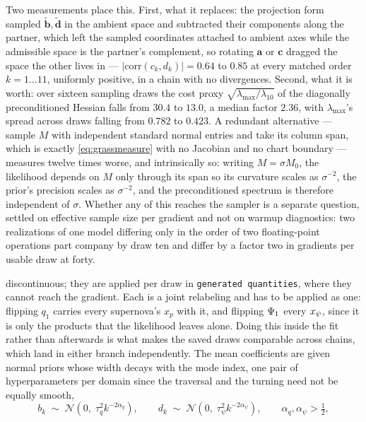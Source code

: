 \documentclass[11pt]{article}
\theoremstyle{plain}
\begin{document}
Two measurements place this. First, what it replaces: the projection form sampled
$\tilde{\mathbf{b}}, \tilde{\mathbf{d}}$ in the ambient space and subtracted their components
along the partner, which left the sampled coordinates attached to ambient axes while the
admissible space is the partner's complement, so rotating $\mathbf{a}$ or $\mathbf{c}$
dragged the space the other lives in --- $|\mathrm{corr}(c_{k}, d_{k})| = 0.64$ to $0.85$ at
every matched order $k = 1 \ldots 11$, uniformly positive, in a chain with no divergences.
Second, what it is worth: over sixteen sampling draws the cost proxy
$\sqrt{\lambda_{\max}/\lambda_{10}}$ of the diagonally preconditioned Hessian falls from
$30.4$ to $13.0$, a median factor $2.36$, with $\lambda_{\max}$'s spread across draws
falling from $0.782$ to $0.423$. A redundant alternative --- sample $M$ with independent
standard normal entries and take its column span, which is exactly
\eqref{eq:grassmeasure} with no Jacobian and no chart boundary --- measures twelve times
worse, and intrinsically so: writing $M = \sigma M_{0}$, the likelihood depends on $M$ only
through its span so its curvature scales as $\sigma^{-2}$, the prior's precision scales as
$\sigma^{-2}$, and the preconditioned spectrum is therefore independent of $\sigma$.
Whether any of this reaches the sampler is a separate question, settled on effective sample
size per gradient and not on warmup diagnostics: two realizations of one model differing
only in the order of two floating-point operations part company by draw ten and differ by a
factor two in gradients per usable draw at forty.

discontinuous; they are applied per draw in \texttt{generated quantities}, where they
cannot reach the gradient. Each is a joint relabeling and has to be applied as one:
flipping $q_{1}$ carries every supernova's $x_p$ with it, and flipping $\Psi_{1}$ every
$x_{\psi}$, since it is only the products that the likelihood leaves alone. Doing this
inside the fit rather than afterwards is what makes the saved draws comparable across
chains, which land in either branch independently.
The mean coefficients are given normal priors whose width decays with the mode index, one
pair of hyperparameters per domain since the traversal and the turning need not be equally
smooth,
\begin{equation}
  b_{k} \;\sim\; \mathcal{N}\!\left(0,\; \tau_{q}^{2} k^{-2\alpha_{q}}\right) ,
  \qquad
  d_{k} \;\sim\; \mathcal{N}\!\left(0,\; \tau_{\psi}^{2} k^{-2\alpha_{\psi}}\right) ,
  \qquad \alpha_{q}, \alpha_{\psi} > \tfrac{1}{2} ,
  \label{eq:coefprior}
\end{equation}
\end{document}
